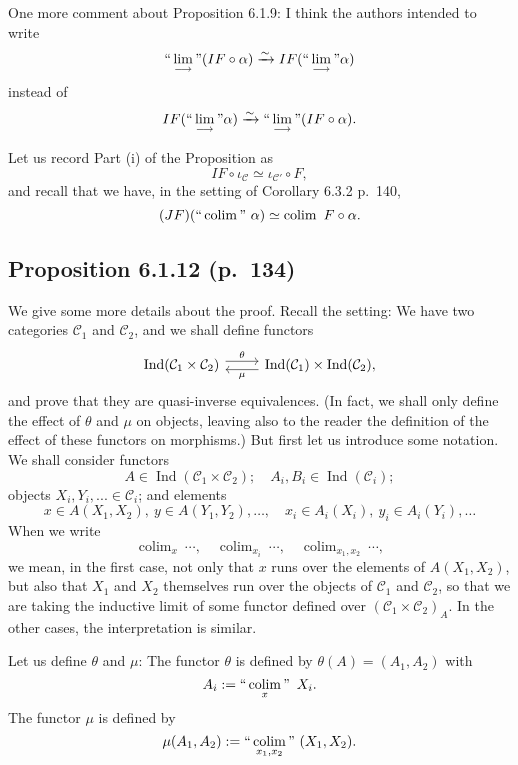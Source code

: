 \documentclass[12pt]{article}%
\theoremstyle{remark}
\theoremstyle{definition}
\newcommand{\C}{\mathcal C}
\newcommand{\ilim}{\operatornamewithlimits{\underset{\longrightarrow}{lim}}}
\DeclareMathOperator*{\colim}{colim}
\DeclareMathOperator*{\ic}{``\colim"}
\DeclareMathOperator{\Ind}{Ind}
\begin{document}
One more comment about Proposition 6.1.9: I think the authors intended to write 
%
\begin{equation}\label{133ii}
``\ilim"(IF\circ\alpha)\xrightarrow\sim IF(``\ilim"\alpha)
\end{equation} 
%
instead of 
$$
IF(``\ilim"\alpha)\xrightarrow\sim``\ilim"(IF\circ\alpha). 
$$ 

Let us record Part (i) of the Proposition as 
%
\begin{equation}\label{133i}
IF\circ\iota_\C\simeq\iota_{\C'}\circ F, 
\end{equation} 
%
and recall that we have, in the setting of Corollary 6.3.2 p.~140, 
%
\begin{equation}\label{140}
(JF)(``\colim"\ \alpha)\simeq\colim\ F\circ\alpha.
\end{equation}


\subsection{Proposition 6.1.12 (p.~134)}\label{6112}

We give some more details about the proof. Recall the setting: We have two categories $\C_1$ and $\C_2$, and we shall define functors
$$
\begin{tikzcd}
\Ind(\C_1\times\C_2)\ar[yshift=0.7ex]{r}{\theta}&\Ind(\C_1)\times\Ind(\C_2),\ar[yshift=-0.7ex]{l}{\mu}
\end{tikzcd}
$$ 
and prove that they are quasi-inverse equivalences. (In fact, we shall only define the effect of $\theta$ and $\mu$ on objects, leaving also to the reader the definition of the effect of these functors on morphisms.) But first let us introduce some notation. We shall consider functors 
$$
A\in\Ind(\C_1\times\C_2);\quad A_i,B_i\in\Ind(\C_i);
$$ 
objects $X_i,Y_i,...\in\C_i$; and elements 
$$
x\in A(X_1,X_2),\ y\in A(Y_1,Y_2),\dots,\quad x_i\in A_i(X_i),\ y_i\in A_i(Y_i),\dots
$$ 
When we write 
$$
\colim_x\ \cdots,\quad\colim_{x_i}\ \cdots,\quad\colim_{x_1,x_2}\ \cdots,
$$ 
we mean, in the first case, not only that $x$ runs over the elements of $A(X_1,X_2)$, but also that $X_1$ and $X_2$ themselves run over the objects of $\C_1$ and $\C_2$, so that we are taking the inductive limit of some functor defined over $(\C_1\times\C_2)_A$. In the other cases, the interpretation is similar. 

Let us define $\theta$ and $\mu$: The functor $\theta$ is defined by $\theta(A)=(A_1,A_2)$ with
%
\begin{equation}\label{ai}
A_i:=\ic_x\ X_i. 
\end{equation}
%
The functor $\mu$ is defined by 
$$
\mu(A_1,A_2):=\ic_{x_1,x_2}\ (X_1,X_2). 
$$ 
\end{document}
